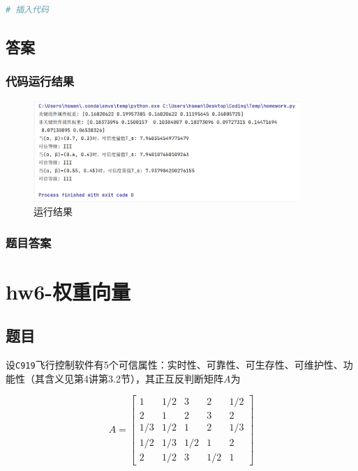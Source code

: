\documentclass{article}
\begin{document}
\begin{lstlisting}[language=Python]
	# 插入代码
\end{lstlisting}

\subsection{答案}

\subsubsection{代码运行结果}

\begin{figure}[H]
	\centering
	\includegraphics[width=0.9\textwidth]{img/1.png}
	\caption{运行结果}
\end{figure}

\subsubsection{题目答案}
















\section{hw6-权重向量}

\subsection{题目}

设\texttt{C919}飞行控制软件有5个可信属性：实时性、可靠性、可生存性、可维护性、功能性（其含义见第4讲第3.2节），其正互反判断矩阵$A$为

$$
A = \begin{bmatrix}
	1 & 1/2 & 3 & 2 & 1/2 \\
	2 & 1 & 2 & 3 & 2 \\
	1/3 & 1/2 & 1 & 2 & 1/3 \\
	1/2 & 1/3 & 1/2 & 1 & 2 \\
	2 & 1/2 & 3 & 1/2 & 1
\end{bmatrix}
$$
\end{document}
